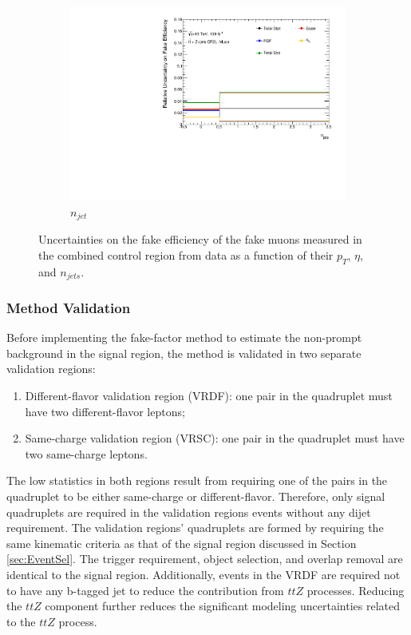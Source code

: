 \begin{figure}[!htb]
\begin{center}
\begin{subfigure}{.48\textwidth}
        \includegraphics[width=.95\linewidth]{figures/Analysis/Background/SystematicUncertainties3D_Muon_njet.pdf}
        \caption{$n_{jet}$ \label{fig:FakeUnc_njet_mu}}
    \end{subfigure}
    \end{center}
\caption{Uncertainties on the fake efficiency of the fake muons measured in the combined control region from data as a function of their $p_{T}$, $\eta$, and $n_{jets}$. \label{fig:FakeEffUnc_3D_Muon}}
\end{figure}

\subsubsection{Method Validation}
\label{subsubsec:Validation}
Before implementing the fake-factor method to estimate the non-prompt background in the signal region, the method is validated in two separate validation regions:
\begin{enumerate}
    \item{ Different-flavor validation region (VRDF): one pair in the quadruplet must have two different-flavor leptons;}
    \item{ Same-charge validation region (VRSC): one pair in the quadruplet must have two same-charge leptons.}
\end{enumerate}

The low statistics in both regions result from requiring one of the pairs in the quadruplet to be either same-charge or different-flavor. Therefore, only signal quadruplets are required in the validation regions events without any dijet requirement. The validation regions' quadruplets are formed by requiring the same kinematic criteria as that of the signal region discussed in Section \ref{sec:EventSel}. The trigger requirement, object selection, and overlap removal are identical to the signal region. Additionally, events in the VRDF are required not to have any b-tagged jet to reduce the contribution from $ttZ$ processes. Reducing the $ttZ$ component further reduces the significant modeling uncertainties related to the $ttZ$ process.

